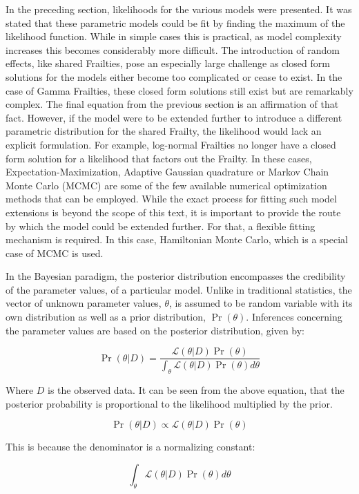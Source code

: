 In the preceding section, likelihoods for the various models were presented. It was stated that these parametric models could be fit by finding the maximum of the likelihood function. While in simple cases this is practical, as model complexity increases this becomes considerably more difficult. The introduction of random effects, like shared Frailties, pose an especially large challenge as closed form solutions for the models either become too complicated or cease to exist. In the case of Gamma Frailties, these closed form solutions still exist but are remarkably complex. The final equation from the previous section is an affirmation of that fact. However, if the model were to be extended further to introduce a different parametric distribution for the shared Frailty, the likelihood would lack an explicit formulation. For example, log-normal Frailties no longer have a closed form solution for a likelihood that factors out the Frailty. In these cases, Expectation-Maximization, Adaptive Gaussian quadrature or Markov Chain Monte Carlo (MCMC) are some of the few available numerical optimization methods that can be employed\cite{Wienke2010}. While the exact process for fitting such model extensions is beyond the scope of this text, it is important to provide the route by which the model could be extended further. For that, a flexible fitting mechanism is required. In this case, Hamiltonian Monte Carlo, which is a special case of MCMC is used. 

In the Bayesian paradigm, the posterior distribution encompasses the credibility of the parameter values, of a particular model. Unlike in traditional statistics, the vector of unknown parameter values, $\theta$, is assumed to be random variable with its own distribution as well as a prior distribution, $\Pr(\theta)$\cite{Ibrahim2005}. Inferences concerning the parameter values are based on the posterior distribution, given by:

$$ \Pr(\theta|D) = \frac{\mathcal {L}(\theta|D)\Pr(\theta)}{\int_\theta\mathcal {L}(\theta|D)\Pr(\theta) d\theta} $$

Where $D$ is the observed data. It can be seen from the above equation, that the posterior probability is proportional to the likelihood multiplied by the prior. 

$$ \Pr(\theta|D) \propto  \mathcal {L}(\theta|D)\Pr(\theta) $$

This is because the denominator is a normalizing constant: 

$$ \int_\theta\mathcal {L}(\theta|D)\Pr(\theta) d\theta $$

